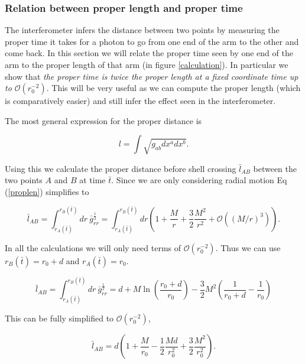 \documentclass[aps,showpacs,onecolumn,floats,prd,superscriptaddress,nofootinbib]{revtex4-1}
\begin{document}
\subsubsection{Relation between proper length and proper time}

The interferometer infers the distance between two points by measuring the proper time it takes for a photon to go from one end of the arm to the other and come back. In this section we will relate the proper time seen by one end of the arm to the proper length of that arm (in figure \ref{calculation}). 
In particular we show that \emph{the proper time is twice the proper length at a fixed coordinate time up to $\mathcal{O}(r_0^{-2})$}. This will be very useful as we can compute the proper length (which is comparatively easier) and still infer the effect seen in the interferometer.

 The most general expression for the proper distance is 

\begin{equation}
	l = \int \sqrt{g_{ab} dx^a dx^b}.	\label{proplen}
\end{equation}

Using this we calculate the proper distance before shell crossing $\bar{l}_{AB}$ between the two points $A$ and $B$ at time $\bar{t}$. Since we are only considering radial motion Eq (\ref{proplen}) simplifies to

\begin{equation}
	\bar{l}_{AB} = \int^{r_B(\bar{t})}_{r_A(\bar{t})} dr \ \bar{g}_{rr}^\frac{1}{2}  = \int^{r_B(\bar{t})}_{r_A(\bar{t})} dr \left( 1 + \frac{M}{r} + \frac{3}{2} \frac{M^2}{r^2}  + \mathcal{O}((M/r)^3) \right).
\end{equation}

In all the calculations we will only need terms of $\mathcal{O}(r_0^{-2})$. Thus we can use $r_B(\bar{t}) = r_0 + d$ and $r_A(\bar{t})  = r_0$. 

\begin{equation}
	 \bar{l}_{AB} =  \int^{r_B(\bar{t})}_{r_A(\bar{t})}  dr \ \bar{g}_{rr}^\frac{1}{2}  = d + M \ln \left( \frac{r_0 + d}{r_0} \right) - \frac{3}{2} M^2 \left( \frac{1}{r_0 + d} - \frac{1}{r_0} \right)
\end{equation}

This can be fully simplified to $\mathcal{O}(r_0^{-2})$,

\begin{equation}
	 \bar{l}_{AB} =  d \left( 1 + \frac{M}{r_0} - \frac{1}{2} \frac{Md}{r_0^2} + \frac{3}{2} \frac{M^2}{r_0^2} \right).
\end{equation}
\end{document}
